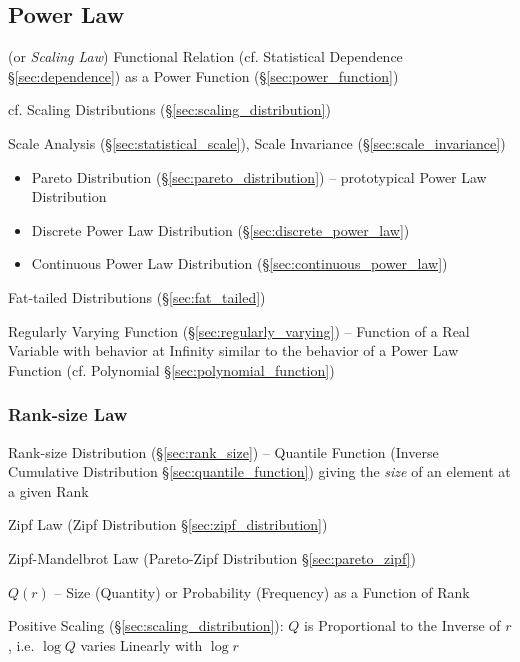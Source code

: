 \subsection{Power Law}\label{sec:power_law}

(or \emph{Scaling Law}) Functional Relation (cf. Statistical Dependence
\S\ref{sec:dependence}) as a Power Function (\S\ref{sec:power_function})

cf. Scaling Distributions (\S\ref{sec:scaling_distribution})


Scale Analysis (\S\ref{sec:statistical_scale}), Scale Invariance
(\S\ref{sec:scale_invariance})

\begin{itemize}
  \item Pareto Distribution (\S\ref{sec:pareto_distribution}) -- prototypical
    Power Law Distribution
  \item Discrete Power Law Distribution (\S\ref{sec:discrete_power_law})
  \item Continuous Power Law Distribution (\S\ref{sec:continuous_power_law})
\end{itemize}

\fist Fat-tailed Distributions (\S\ref{sec:fat_tailed})

\fist Regularly Varying Function (\S\ref{sec:regularly_varying}) -- Function of
a Real Variable with behavior at Infinity similar to the behavior of a Power Law
Function (cf. Polynomial \S\ref{sec:polynomial_function})



\subsubsection{Rank-size Law}\label{sec:ranksize_law}

Rank-size Distribution (\S\ref{sec:rank_size}) -- Quantile Function (Inverse
Cumulative Distribution \S\ref{sec:quantile_function}) giving the \emph{size} of
an element at a given Rank

Zipf Law (Zipf Distribution \S\ref{sec:zipf_distribution})

Zipf-Mandelbrot Law (Pareto-Zipf Distribution \S\ref{sec:pareto_zipf})

$Q(r)$ -- Size (Quantity) or Probability (Frequency) as a Function of Rank

Positive Scaling (\S\ref{sec:scaling_distribution}): $Q$ is Proportional to the
Inverse of $r$, i.e. $\log Q$ varies Linearly with $\log r$

